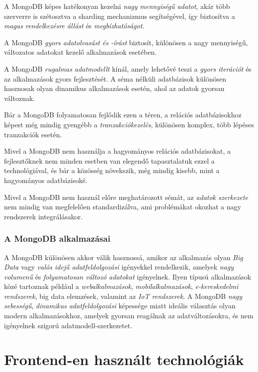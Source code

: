 \documentclass[
]{thesis-ekf}
\theoremstyle{definition}
\theoremstyle{remark}
\begin{document}
A MongoDB képes hatékonyan kezelni \emph{nagy mennyiségű adatot}, akár több szerverre is szétosztva a sharding mechanizmus segítségével, így biztosítva a \emph{magas rendelkezésre állást} és \emph{megbízhatóságot}.

A MongoDB \emph{gyors adatolvasást és -írást} biztosít, különösen a nagy mennyiségű, változatos adatokat kezelő alkalmazások esetében.

A MongoDB \emph{rugalmas adatmodellt} kínál, amely lehetővé teszi a \emph{gyors iterációt} és az alkalmazások gyors fejlesztését. A séma nélküli adatbázisok különösen hasznosak olyan dinamikus alkalmazások esetén, ahol az adatok gyorsan változnak.

Bár a MongoDB folyamatosan fejlődik ezen a téren, a relációs adatbázisokhoz képest még mindig gyengébb a \emph{tranzakciókezelés}, különösen komplex, több lépéses tranzakciók esetén.

Mivel a MongoDB nem használja a hagyományos relációs adatbázisokat, a fejlesztőknek nem minden esetben van elegendő tapasztalatuk ezzel a technológiával, és bár a közösség növekszik, még mindig kisebb, mint a hagyományos adatbázisoké.

Mivel a MongoDB nem használ előre meghatározott sémát, az \emph{adatok szerkezete} nem mindig van megfelelően standardizálva, ami problémákat okozhat a nagy rendszerek integrálásakor.

\subsection{A MongoDB alkalmazásai}
A MongoDB különösen akkor válik hasznossá, amikor az alkalmazás olyan \emph{Big Data} vagy \emph{valós idejű adatfeldolgozási} igényekkel rendelkezik, amelyek \emph{nagy volumenű} és \emph{folyamatosan változó adatokat} igényelnek. Ilyen típusú alkalmazások közé tartoznak például a \emph{webalkalmazások}, \emph{mobilalkalmazások}, \emph{e-kereskedelmi rendszerek}, big data elemzések, valamint az \emph{IoT rendszerek}. A MongoDB \emph{nagy sebességű}, \emph{dinamikus adatfeldolgozási} képessége miatt ideális választás olyan modern alkalmazásokhoz, amelyek gyorsan reagálnak az adatváltozásokra, és nem igényelnek szigorú adatmodell-szerkezetet.

\chapter{Frontend-en használt technológiák}
\end{document}
